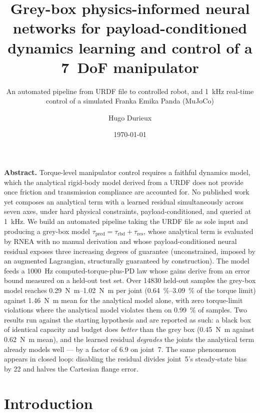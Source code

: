 \documentclass[a4paper, oneside]{article}
\author{Hugo Durieux}
\date{\today}
\title{Grey-box physics-informed neural networks for payload-conditioned
dynamics learning and control of a 7~DoF manipulator}
\subtitle{An automated pipeline from URDF file to controlled robot, and
\SI{1}{\kilo\hertz} real-time control of a simulated Franka Emika Panda
(MuJoCo)}
\newcommand{\taurbd}{\ensuremath{\tau_{\mathrm{rbd}}}}
\newcommand{\taures}{\ensuremath{\tau_{\mathrm{res}}}}
\newcommand{\taupred}{\ensuremath{\tau_{\mathrm{pred}}}}
\begin{document}
\maketitle

\begin{center}
\begin{minipage}{0.88\textwidth}
\small
\textbf{Abstract.} Torque-level manipulator control requires a faithful dynamics
model, which the analytical rigid-body model derived from a URDF does not
provide once friction and transmission compliance are accounted for. No
published work yet composes an analytical term with a learned residual
simultaneously across seven axes, under hard physical constraints,
payload-conditioned, and queried at \SI{1}{\kilo\hertz}. We build an automated
pipeline taking the URDF file as sole input and producing a grey-box model
$\taupred = \taurbd + \taures$, whose analytical term is evaluated by RNEA with
no manual derivation and whose payload-conditioned neural residual exposes
three increasing degrees of guarantee (unconstrained, imposed by an augmented
Lagrangian, structurally guaranteed by construction). The model feeds a
\SI{1000}{\hertz} computed-torque-plus-PD law whose gains derive from an error bound
measured on a held-out test set. Over \SI{14830}{} held-out samples the grey-box
model reaches \SIrange{0.29}{1.02}{\newton\meter} per joint
(\SIrange{0.64}{3.09}{\percent} of the torque limit) against
\SI{1.46}{\newton\meter} mean for the analytical model alone, with zero
torque-limit violations where the analytical model violates them on
\SI{0.99}{\percent} of samples. Two results run against the starting hypothesis
and are reported as such: a black box of identical capacity and budget does
\emph{better} than the grey box (\SI{0.45}{\newton\meter} against
\SI{0.62}{\newton\meter} mean), and the learned residual \emph{degrades} the
joints the analytical term already models well --- by a factor of \num{6.9} on
joint~7. The same phenomenon appears in closed loop: disabling the residual
divides joint~5's steady-state bias by \num{22} and halves the Cartesian flange
error.

\medskip
\end{minipage}
\end{center}

\setcounter{tocdepth}{2}
\tableofcontents
\newpage

\section{Introduction}
\label{sec-intro}
\end{document}
